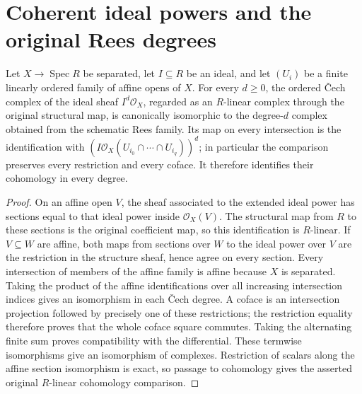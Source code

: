 \section{Coherent ideal powers and the original Rees degrees}

\begin{lemma}
\label{lem:fc-rees-cech-ideal-power-sections}
\leanok
{}
Let $X\to\operatorname{Spec}R$ be separated, let $I\subseteq R$ be an
ideal, and let $(U_i)$ be a finite linearly ordered family of affine opens
of $X$.  For every $d\geq0$, the ordered Čech complex of the ideal
sheaf $I^d\mathcal O_X$, regarded as an $R$-linear complex through the
original structural map, is canonically isomorphic to the degree-$d$
complex obtained from the schematic Rees family.  Its map on every
intersection is the identification with
$(I\mathcal O_X(U_{i_0}\cap\cdots\cap U_{i_q}))^d$; in particular the
comparison preserves every restriction and every coface.  It therefore
identifies their cohomology in every degree.
\end{lemma}
\begin{proof}
On an affine open $V$, the sheaf associated to the extended ideal power
has sections equal to that ideal power inside $\mathcal O_X(V)$.  The
structural map from $R$ to these sections is the original coefficient
map, so this identification is $R$-linear.  If $V\subseteq W$ are affine,
both maps from sections over $W$ to the ideal power over $V$ are the
restriction in the structure sheaf, hence agree on every section.
Every intersection of members of the affine family is affine because
$X$ is separated.  Taking the product of the affine identifications over
all increasing intersection indices gives an isomorphism in each Čech
degree.  A coface is an intersection projection followed by precisely
one of these restrictions; the restriction equality therefore proves
that the whole coface square commutes.  Taking the alternating finite
sum proves compatibility with the differential.  These termwise
isomorphisms give an isomorphism of complexes.  Restriction of scalars
along the affine section isomorphism is exact, so passage to cohomology
gives the asserted original $R$-linear cohomology comparison.
\end{proof}
